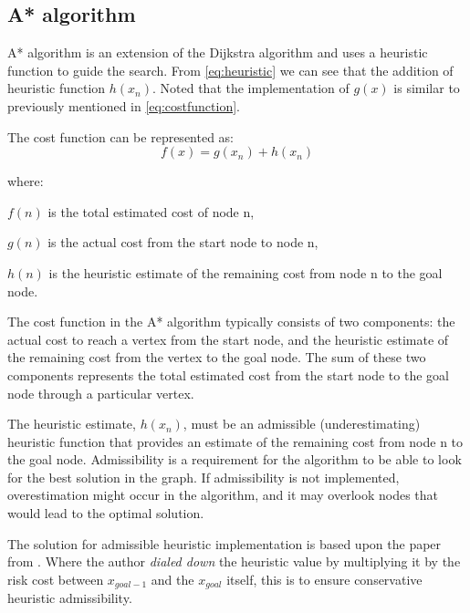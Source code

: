 \documentclass[12pt]{report}
\begin{document}
        \subsection{A* algorithm}
        A* algorithm is an extension of the Dijkstra algorithm and uses a heuristic function to guide the search. From
        \ref{eq:heuristic} we can see that the addition of heuristic function \(h(x_n)\). Noted that the implementation
        of \(g(x)\) is similar to previously mentioned in \ref{eq:costfunction}.

        The cost function can be represented as:
        \begin{equation}\label{eq:heuristic}
            f(x)=g(x_n)+h(x_n)
        \end{equation}

        where:
        \begin{myitemize}
            \item \(f(n)\) is the total estimated cost of node n,
            \item \(g(n)\) is the actual cost from the start node to node n,
            \item \(h(n)\) is the heuristic estimate of the remaining cost from node n to the goal node.
        \end{myitemize}

        The cost function in the A* algorithm typically consists of two components: the actual cost to reach a vertex
        from the start node, and the heuristic estimate of the remaining cost from the vertex to the goal node. The sum
        of these two components represents the total estimated cost from the start node to the goal node through a
        particular vertex.
            
        The heuristic estimate, \(h(x_n)\), must be an admissible (underestimating) heuristic function that provides an
        estimate of the remaining cost from node n to the goal node. Admissibility is a requirement for the algorithm to
        be able to look for the best solution in the graph. If admissibility is not implemented, overestimation might
        occur in the algorithm, and it may overlook nodes that would lead to the optimal solution.
            
        The solution for admissible heuristic implementation is based upon the paper from
        \cite{primatesta_risk-aware_2019}. Where the author \textit{dialed down} the heuristic value by multiplying it
        by the risk cost between \(x_{goal-1}\) and the \(x_{goal}\) itself, this is to ensure conservative heuristic
        admissibility.
\end{document}
